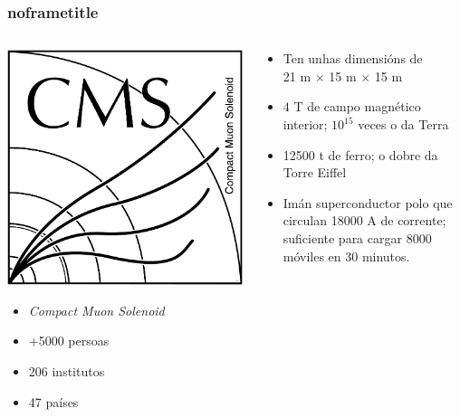 \documentclass{beamer}
\begin{document}
\begin{frame}
\frametitle{noframetitle}

\begin{columns}[T]
  \begin{column}{0.35\textwidth}
  \begin{center}
    \includegraphics[scale=0.2]{gpx/cms_logo.pdf}
  \end{center}
  \begin{itemize}
    \item \emph{Compact Muon Solenoid}
    \item +5000 persoas
    \item 206 institutos
    \item 47 países
    \end{itemize}
  \end{column}


  \begin{column}{0.55\textwidth}
    \begin{itemize}
    \item Ten unhas dimensións de \\ 21 m $\times$ 15 m $\times$ 15 m
    \item $4$ T de campo magnético interior; $10^{15}$ veces o da Terra
    \item 12500 t de ferro; o dobre da Torre Eiffel
    \item Imán superconductor polo que circulan 18000 A de corrente; suficiente
    para cargar 8000 móviles en 30 minutos.
    \end{itemize}
    

\end{column}
\end{columns}
\end{frame}
\end{document}
